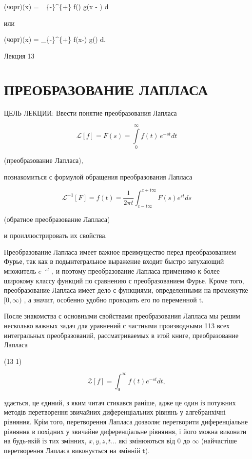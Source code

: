 \documentclass[
  ukrainian,
]{article}
\begin{document}
(чорт)(x) =  \int\_\{-\infty\}\^{}\{+\infty\}
f(\xi) g(x - \xi) d\xi

или

(чорт)(x) =  \int\_\{-\infty\}\^{}\{+\infty\}
f(x-\xi) g(\xi) d\xi.

Лекция 13

\section{ПРЕОБРАЗОВАНИЕ
ЛАПЛАСА}\label{ux43fux440ux435ux43eux431ux440ux430ux437ux43eux432ux430ux43dux438ux435-ux43bux430ux43fux43bux430ux441ux430}

ЦЕЛЬ ЛЕКЦИИ: Ввести понятие преобразования Лапласа

\[
\mathscr{L}[f] = F(s) = \int\limits_0^\infty f(t)\,e^{-st}dt
\]

(преобразование Лапласа),

познакомиться с формулой обращения преобразования Лапласа

\[
\mathscr{L}^{-1}[F] = f(t) = \frac{1}{2\pi t} \int_{c-t\infty}^{c+t\infty} F(s) e^{st} ds
\]

(обратное преобразование Лапласа)

и проиллюстрировать их свойства.

Преобразование Лапласа имеет важное преимущество перед преобразованием
Фурье, так как в подынтегральное выражение входит быстро затухающий
множитель \(e^{-st}\) , и поэтому преобразование Лапласа применимо к
более широкому классу функций по сравнению с преобразованием Фурье.
Кроме того, преобразование Лапласа имеет дело с функциями, определенными
на промежутке \([0, \infty)\) , а значит, особенно удобно проводить его
по переменной t.

После знакомства с основными свойствами преобразования Лапласа мы решим
несколько важных задач для уравнений с частными производными 113 всех
интегральных преобразований, рассматриваемых в этой книге,
преобразование Лапласа

(13 1)

\[
\mathscr{Z}[f] = \int_{0}^{\infty} f(t) e^{-st} dt,
\]

здається, це єдиний, з яким читач стикався раніше, адже це один із
потужних методів перетворення звичайних диференціальних рівнянь у
алгебранхічні рівняння. Крім того, перетворення Лапласа дозволяє
перетворити диференціальне рівняння в похідних у звичайне диференціальне
рівняння, і його можна виконати на будь-якій із тих змінних,
\(x, y, z, t \ldots\) які змінюються від 0 до \(\infty\) (найчастіше
перетворення Лапласа виконується на змінній t).
\end{document}
